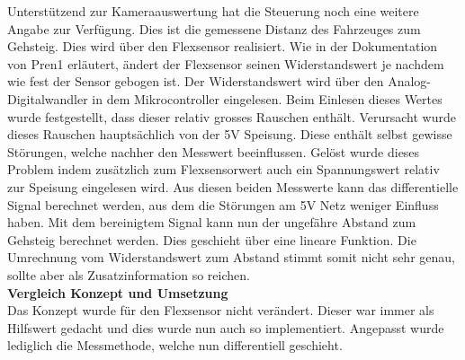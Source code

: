 Unterstützend zur Kameraauswertung hat die Steuerung noch eine weitere Angabe zur Verfügung. Dies ist die gemessene Distanz des Fahrzeuges zum Gehsteig. Dies wird über den Flexsensor realisiert. Wie in der Dokumentation von Pren1 erläutert, ändert der Flexsensor seinen Widerstandswert je nachdem wie fest der Sensor gebogen ist. Der Widerstandswert wird über den Analog-Digitalwandler in dem Mikrocontroller eingelesen. Beim Einlesen dieses Wertes wurde festgestellt, dass dieser relativ grosses Rauschen enthält. Verursacht wurde dieses Rauschen hauptsächlich von der 5V Speisung. Diese enthält selbst gewisse Störungen, welche nachher den Messwert beeinflussen. Gelöst wurde dieses Problem indem zusätzlich zum Flexsensorwert auch ein Spannungswert relativ zur Speisung eingelesen wird. Aus diesen beiden Messwerte kann das differentielle Signal berechnet werden, aus dem die Störungen am 5V Netz weniger Einfluss haben. Mit dem bereinigtem Signal kann nun der ungefähre Abstand zum Gehsteig berechnet werden. Dies geschieht über eine lineare Funktion. Die Umrechnung vom Widerstandswert zum Abstand stimmt somit nicht sehr genau, sollte aber als Zusatzinformation so reichen.%
\\[0.2cm]
\textbf{Vergleich Konzept und Umsetzung}\\[0.2cm]
Das Konzept wurde für den Flexsensor nicht verändert. Dieser war immer als Hilfswert gedacht und dies wurde nun auch so implementiert. Angepasst wurde lediglich die Messmethode, welche nun differentiell geschieht.